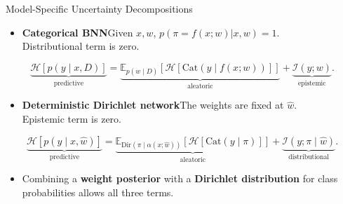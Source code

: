 \begin{frame}{Model-Specific Uncertainty Decompositions}
\label{frm:backup-model-decompositions}
\begin{itemize}
\item \textbf{Categorical BNN}\quad Given $x,w$, $p(\pi=f(x;w)|x,w) = 1$.\\
Distributional term is zero.
\end{itemize}
{\small
\[
\underbrace{\mathcal H[p(y\mid x,D)]}_{\text{predictive}}
=\underbrace{\mathbb E_{p(w\mid D)}\!\left[\mathcal H[\mathrm{Cat}(y\mid f(x;w))]\right]}_{\text{aleatoric}}
+\underbrace{\mathcal I(y;w)}_{\text{epistemic}}.
\]
}
\medskip
\begin{itemize}
\item \textbf{Deterministic Dirichlet network}\quad The weights are fixed at $\hat{w}$.\\
Epistemic term is zero.
\end{itemize}
{\small
\[
\underbrace{\mathcal H[p(y\mid x,\hat{w})]}_{\text{predictive}}
=\underbrace{\mathbb E_{\mathrm{Dir}(\pi\mid\alpha(x;\hat{w}))}\!\left[\mathcal H[\mathrm{Cat}(y\mid\pi)]\right]}_{\text{aleatoric}}
+\underbrace{\mathcal I(y;\pi\mid\hat{w})}_{\text{distributional}}.
\]
}
\medskip
\begin{itemize}
\item Combining a \textbf{weight posterior} with a \textbf{Dirichlet distribution} for class probabilities allows all three terms.
\end{itemize}
\end{frame}

